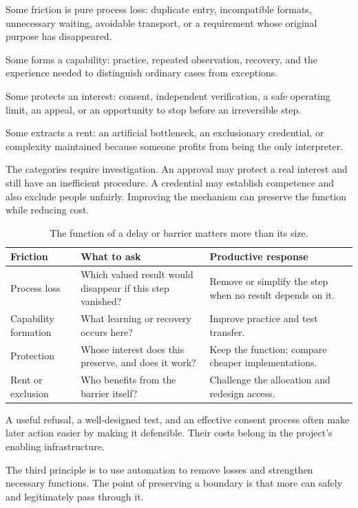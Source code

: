 \documentclass[11pt,openany]{book}
\begin{document}
Some friction is pure process loss: duplicate entry, incompatible formats, unnecessary waiting, avoidable transport, or a requirement whose original purpose has disappeared.

Some forms a capability: practice, repeated observation, recovery, and the experience needed to distinguish ordinary cases from exceptions.

Some protects an interest: consent, independent verification, a safe operating limit, an appeal, or an opportunity to stop before an irreversible step.

Some extracts a rent: an artificial bottleneck, an exclusionary credential, or complexity maintained because someone profits from being the only interpreter.

The categories require investigation. An approval may protect a real interest and still have an inefficient procedure. A credential may establish competence and also exclude people unfairly. Improving the mechanism can preserve the function while reducing cost.

\begin{table}[ht]
\centering\small
\begin{tabularx}{\textwidth}{@{}lYY@{}}
\toprule
Friction & What to ask & Productive response\\
\midrule
Process loss & Which valued result would disappear if this step vanished? & Remove or simplify the step when no result depends on it.\\
Capability formation & What learning or recovery occurs here? & Improve practice and test transfer.\\
Protection & Whose interest does this preserve, and does it work? & Keep the function; compare cheaper implementations.\\
Rent or exclusion & Who benefits from the barrier itself? & Challenge the allocation and redesign access.\\
\bottomrule
\end{tabularx}
\caption{The function of a delay or barrier matters more than its size.}
\end{table}

A useful refusal, a well-designed test, and an effective consent process often make later action easier by making it defensible. Their costs belong in the project's enabling infrastructure.

The third principle is to use automation to remove losses and strengthen necessary functions. The point of preserving a boundary is that more can safely and legitimately pass through it.
\end{document}
